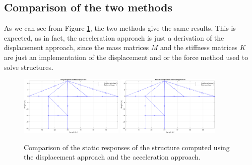 \subsection{Comparison of the two methods}
\label{subsec:comparison_of_the_two_methods}

As we can see from Figure \ref{fig:static_responses}, the two methods give the same results.
This is expected, as in fact, the acceleration approach is just a derivation of the displacement approach, since the mass matrices $M$ and the stiffness matrices $K$ are just an implementation of the displacement and or the force method used to solve structures.

\begin{figure}[H]
    \centering
    \includegraphics[width=0.45\textwidth]{img/MATLAB/Responses/Gravity_displacement.png}
    \hfill
    \includegraphics[width=0.45\textwidth]{img/MATLAB/Responses/Gravity_acceleration.png}
    \caption{Comparison of the static responses of the structure computed using the displacement approach and the acceleration approach.}
    \label{fig:static_responses}
\end{figure}
